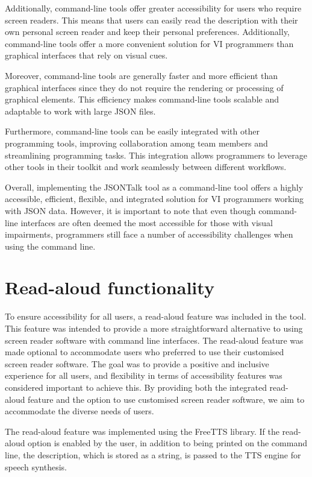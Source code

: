 \documentclass{l4proj}
\begin{document}
Additionally, command-line tools offer greater accessibility for users who require screen readers. This means that users can easily read the description with their own personal screen reader and keep their personal preferences. Additionally, command-line tools offer a more convenient solution for VI programmers than graphical interfaces that rely on visual cues.

Moreover, command-line tools are generally faster and more efficient than graphical interfaces since they do not require the rendering or processing of graphical elements. This efficiency makes command-line tools scalable and adaptable to work with large JSON files.

Furthermore, command-line tools can be easily integrated with other programming tools, improving collaboration among team members and streamlining programming tasks. This integration allows programmers to leverage other tools in their toolkit and work seamlessly between different workflows. 

Overall, implementing the JSONTalk tool as a command-line tool offers a highly accessible, efficient, flexible, and integrated solution for VI programmers working with JSON data. However, it is important to note that even though command-line interfaces are often deemed the most accessible for those with visual impairments, programmers still face a number of accessibility challenges when using the command line. 

\section{Read-aloud functionality}

To ensure accessibility for all users, a read-aloud feature was included in the tool. This feature was intended to provide a more straightforward alternative to using screen reader software with command line interfaces. 
The read-aloud feature was made optional to accommodate users who preferred to use their customised screen reader software.
The goal was to provide a positive and inclusive experience for all users, and flexibility in terms of accessibility features was considered important to achieve this. By providing both the integrated read-aloud feature and the option to use customised screen reader software, we aim to accommodate the diverse needs of users.

The read-aloud feature was implemented using the FreeTTS library. If the read-aloud option is enabled by the user, in addition to being printed on the command line, the description, which is stored as a string, is passed to the TTS engine for speech synthesis. 
\end{document}
